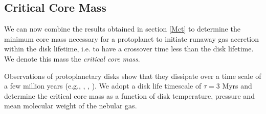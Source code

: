 \documentclass[apj]{emulateapj}
\begin{document}






\subsection{Critical Core Mass}
\label{critcore}

We can now combine the results obtained in section \ref{Mct} to determine the minimum core mass necessary for a protoplanet to initiate runaway gas accretion within the disk lifetime, i.e. to have a crossover time less than the disk lifetime. We  denote this mass the \textit{critical core mass}.


Observations of protoplanetary disks show that they dissipate over a time scale of a few million years (e.g., \citealt{lagrange00}, \citealt{haisch01}, \citealt{goldreich04}). We adopt a disk life timescale of $\tau=3 $ Myrs and determine the critical core mass as a function of disk temperature, pressure and mean molecular weight of the nebular gas. 
\end{document}
